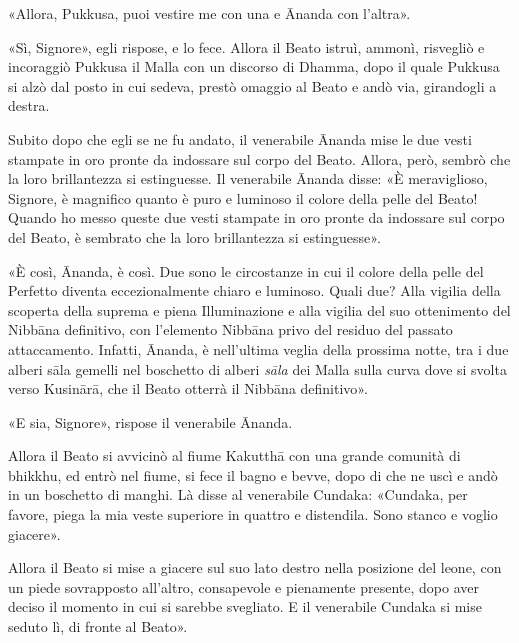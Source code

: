 «Allora, Pukkusa, puoi vestire me con una e Ānanda con l’altra».


«Sì, Signore», egli rispose, e lo fece. Allora il Beato istruì, ammonì,
risvegliò e incoraggiò Pukkusa il Malla con un discorso di Dhamma, dopo
il quale Pukkusa si alzò dal posto in cui sedeva, prestò omaggio al
Beato e andò via, girandogli a destra.


Subito dopo che egli se ne fu andato, il venerabile Ānanda mise le due
vesti stampate in oro pronte da indossare sul corpo del Beato. Allora,
però, sembrò che la loro brillantezza si estinguesse. Il venerabile
Ānanda disse: «È meraviglioso, Signore, è magnifico quanto è puro e
luminoso il colore della pelle del Beato! Quando ho messo queste due
vesti stampate in oro pronte da indossare sul corpo del Beato, è
sembrato che la loro brillantezza si estinguesse».


«È così, Ānanda, è così. Due sono le circostanze in cui il colore della
pelle del Perfetto diventa eccezionalmente chiaro e luminoso. Quali due?
Alla vigilia della scoperta della suprema e piena Illuminazione e alla
vigilia del suo ottenimento del Nibbāna definitivo, con l’elemento
Nibbāna privo del residuo del passato attaccamento. Infatti, Ānanda, è
nell’ultima veglia della prossima notte, tra i due alberi sāla gemelli
nel boschetto di alberi \emph{sāla} dei Malla sulla curva dove si svolta
verso Kusinārā, che il Beato otterrà il Nibbāna definitivo».


«E sia, Signore», rispose il venerabile Ānanda.


Allora il Beato si avvicinò al fiume Kakutthā con una grande comunità di
bhikkhu, ed entrò nel fiume, si fece il bagno e bevve, dopo di che ne
uscì e andò in un boschetto di manghi. Là disse al venerabile Cundaka:
«Cundaka, per favore, piega la mia veste superiore in quattro e
distendila. Sono stanco e voglio giacere».


Allora il Beato si mise a giacere sul suo lato destro nella posizione
del leone, con un piede sovrapposto all’altro, consapevole e pienamente
presente, dopo aver deciso il momento in cui si sarebbe svegliato. E il
venerabile Cundaka si mise seduto lì, di fronte al Beato».




